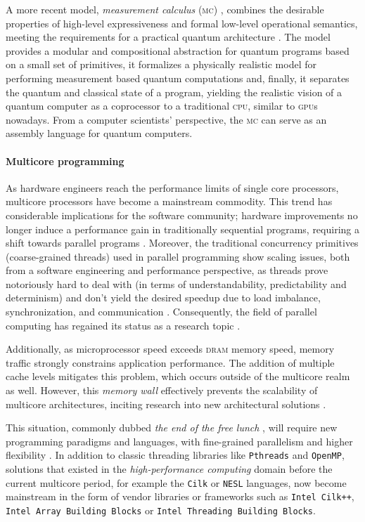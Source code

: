 \documentclass[a4paper,11pt, oneside]{report}
\newcommand{\code}[1]{\texttt{#1}}
\newcommand{\concept}[1]{\emph{#1}}
\newcommand{\acro}[1]{\textsc{#1}}
\begin{document}
A more recent model, \concept{measurement calculus} (\acro{mc}) \cite{danos}, combines the desirable properties of high-level expressiveness and formal low-level operational semantics, meeting the requirements \cite{bettelli} for a practical quantum architecture \cite{vandriessche}. The model provides a modular and compositional abstraction for quantum programs based on a small set of primitives, it formalizes a physically realistic model for performing measurement based quantum computations and, finally, it separates the quantum and classical state of a program, yielding the realistic vision of a quantum computer as a coprocessor to a traditional \acro{cpu}, similar to \acro{gpu}s nowadays. From a computer scientists' perspective, the \acro{mc} can serve as an assembly language for quantum computers.


\paragraph{Multicore programming} As hardware engineers reach the performance limits of single core processors, multicore processors have become a mainstream commodity. This trend has considerable implications for the software community; hardware improvements no longer induce a performance gain in traditionally sequential programs, requiring a shift towards parallel programs \cite{sutter-lunch}. Moreover, the traditional concurrency primitives (coarse-grained threads) used in parallel programming show scaling issues, both from a software engineering and performance perspective, as threads prove notoriously hard to deal with (in terms of understandability, predictability and determinism) and don't yield the desired speedup due to load imbalance, synchronization, and communication \cite{lee}. Consequently, the field of parallel computing has regained its status as a research topic \cite{berkeley}.


Additionally, as microprocessor speed exceeds \acro{dram} memory speed\cite{wulf-mckee}, memory traffic strongly constrains application performance\cite{patterson}. The addition of multiple cache levels mitigates this problem, which occurs outside of the multicore realm as well. However, this \concept{memory wall} effectively prevents the scalability of multicore architectures, inciting research into new architectural solutions \cite{sutter-jungle}.


This situation, commonly dubbed \emph{the end of the free lunch} \cite{sutter-lunch}, will require new programming paradigms and languages, with fine-grained parallelism and higher flexibility \cite{sutter-larus}. In addition to classic threading libraries like \code{Pthreads} and \code{OpenMP}, solutions that existed in the \concept{high-performance computing} domain before the current multicore period, for example the \code{Cilk} \cite{cilk} or \code{NESL} \cite{nesl} languages, now become mainstream in the form of vendor libraries or frameworks such as \code{Intel Cilk++}, \code{Intel Array Building Blocks} or \code{Intel Threading Building Blocks}.
\end{document}
